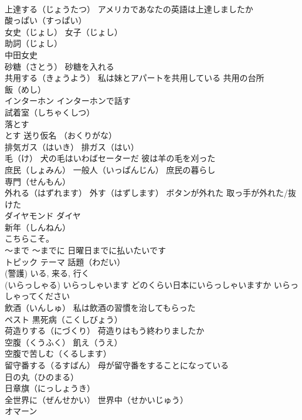 \documentclass[8pt]{extreport}
\begin{document}
\begin{CJK}{UTF8}{min}
\\	上達する（じょうたつ） アメリカであなたの英語は上達しましたか
\\	酸っぱい（すっぱい）
\\	女史（じょし） 女子（じょし）
\\	助詞（じょし）
\\	中田女史
\\	砂糖（さとう） 砂糖を入れる
\\	共用する（きょうよう） 私は妹とアパートを共用している 共用の台所
\\	飯（めし）
\\	インターホン インターホンで話す
\\	試着室（しちゃくしつ）
\\	落とす 
\\	とす	送り仮名 （おくりがな）
\\	排気ガス（はいき） 排ガス（はい）
\\	毛（け） 犬の毛はいわばセーターだ 彼は羊の毛を刈った
\\	庶民（しょみん） 一般人（いっぱんじん） 庶民の暮らし
\\	専門（せんもん）
\\	外れる（はずれます） 外す（はずします） ボタンが外れた 取っ手が外れた/抜けた
\\	ダイヤモンド ダイヤ 
\\	新年（しんねん）
\\	こちらこそ。
\\	～まで ～までに 日曜日までに払いたいです
\\	トピック テーマ 話題（わだい）
\\	(警護) いる, 来る, 行く 
\\	(いらっしゃる) いらっしゃいます どのくらい日本にいらっしゃいますか いらっしゃってください
\\	飲酒（いんしゅ） 私は飲酒の習慣を治してもらった
\\	ペスト 黒死病（こくしびょう）
\\	荷造りする（にづくり） 荷造りはもう終わりましたか
\\	空腹（くうふく） 飢え（うえ）
\\	空腹で苦しむ（くるします）
\\	留守番する（るすばん） 母が留守番をすることになっている
\\	日の丸（ひのまる）
\\	日章旗（にっしょうき）
\\	全世界に（ぜんせかい） 世界中（せかいじゅう）
\\	オマーン

\end{CJK}
\end{document}

